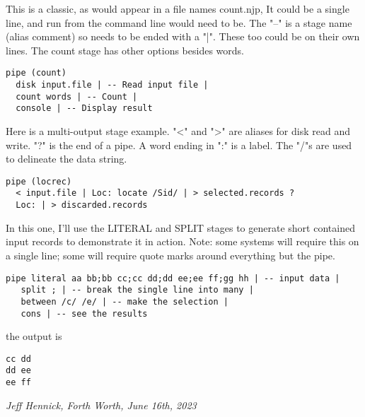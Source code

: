 This is a classic, as would appear in a file names count.njp,  It could be a single line, and run from the command line would need to be.  The "--" is a stage name (alias comment) so needs to be ended with a "|".  These too could be on their own lines.  The count stage has other options besides words.
\begin{lstlisting}
pipe (count)
  disk input.file | -- Read input file |
  count words | -- Count |
  console | -- Display result
\end{lstlisting}
Here is a multi-output stage example. "<" and ">" are aliases for disk read and write. "?" is the end of a pipe.  A word ending in ":" is a label.  The "/"s are used to delineate the data string.
\begin{lstlisting}
pipe (locrec)
  < input.file | Loc: locate /Sid/ | > selected.records ?
  Loc: | > discarded.records
\end{lstlisting}
In this one, I'll use the LITERAL and SPLIT stages to generate short contained input records to demonstrate it in action. Note: some systems will require this on a single line; some will require quote marks around everything but the pipe.
\begin{lstlisting}
pipe literal aa bb;bb cc;cc dd;dd ee;ee ff;gg hh | -- input data |
   split ; | -- break the single line into many |
   between /c/ /e/ | -- make the selection |
   cons | -- see the results
\end{lstlisting}
the output is
\begin{verbatim}
cc dd
dd ee
ee ff
\end{verbatim}



\emph{Jeff Hennick, Forth Worth, June 16th, 2023}
